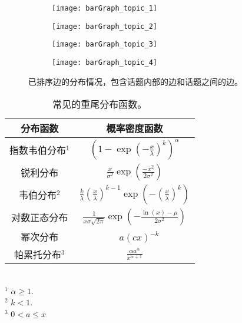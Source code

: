 \begin{figure}[!htbp]
    \centering
    \begin{subfigure}[b]{0.24\textwidth}
      \texttt{[image: barGraph\_topic\_1]}
      \caption{}
      \label{fig:barGraph_t1}
    \end{subfigure}%
    \begin{subfigure}[b]{0.24\textwidth}
      \texttt{[image: barGraph\_topic\_2]}
      \caption{}
      \label{fig:barGraph_t2}
    \end{subfigure}
    \begin{subfigure}[b]{0.24\textwidth}
      \texttt{[image: barGraph\_topic\_3]}
      \caption{}
      \label{fig:barGraph_t3}
    \end{subfigure}%
    \begin{subfigure}[b]{0.24\textwidth}
      \texttt{[image: barGraph\_topic\_4]}
      \caption{}
      \label{fig:barGraph_t4}
    \end{subfigure}
    \caption{已排序边的分布情况，包含话题内部的边和话题之间的边。}
    \label{fig:barGraph}
\end{figure}

\begin{table}[!htbp]
    \caption{常见的重尾分布函数。}
    \label{tab:PDF}
    \centering
    \setlength{\tabcolsep}{4pt}%
    \renewcommand{\arraystretch}{1.2}%
    \begin{tabular}{|c|c|}
        \hline
        分布函数 & 概率密度函数\\
        \hline\hline
        指数韦伯分布$^1$ & $(1-\exp(-\frac{x}{\lambda})^k)^{\alpha}$\\
        \hline
        锐利分布 & $\frac{x}{\sigma^2}\exp(\frac{-x^2}{2\sigma^2})$\\
        \hline
        韦伯分布$^2$ & $\frac{k}{\lambda}(\frac{x}{\lambda})^{k-1}\exp(-(\frac{x}{\lambda})^k)$\\
        \hline
        对数正态分布 & $\frac{1}{x\sigma\sqrt{2\pi}}\exp(-\frac{\ln(x)-\mu}{2\sigma^2})$\\
        \hline
        幂次分布　&　$a(cx)^{-k}$\\
        \hline
        帕累托分布$^3$　& $\frac{\alpha a^{\alpha}}{x^{\alpha+1}}$\\
        \hline
    \end{tabular}\\
    \footnotesize{$^1$ $\alpha \geq 1.$}\\
    \footnotesize{$^2$ $k < 1.$}\\
    \footnotesize{$^3$ $0 < a \leq x$}\\
\end{table}

